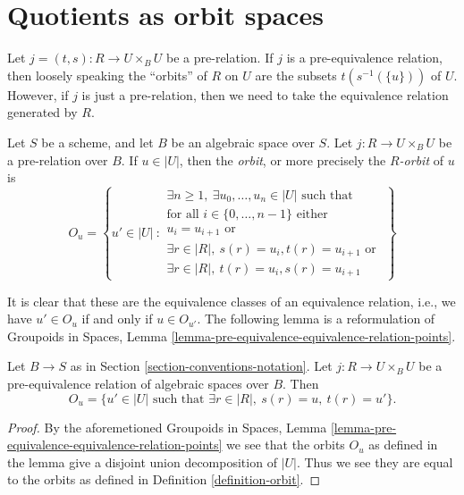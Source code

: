 \section{Quotients as orbit spaces}
\label{section-orbits}

\noindent
Let $j = (t, s) : R \to U \times_B U$ be a pre-relation.
If $j$ is a pre-equivalence relation, then loosely speaking
the ``orbits'' of $R$ on $U$
are the subsets $t(s^{-1}(\{u\}))$ of $U$. However, if $j$ is just a
pre-relation, then we need to take the equivalence relation generated
by $R$.

\begin{definition}
\label{definition-orbit}
Let $S$ be a scheme, and let $B$ be an algebraic space over $S$.
Let $j : R \to U \times_B U$ be a pre-relation over $B$.
If $u \in |U|$, then the {\it orbit}, or more precisely the
{\it $R$-orbit} of $u$ is
$$
O_u =
\left\{
u' \in |U|\ :
\begin{matrix}
\exists n \geq 1,\ \exists u_0, \ldots, u_n \in |U|\text{ such that} \\
\text{for all }i \in \{0, \ldots, n - 1\}\text{ either } \\
u_i = u_{i + 1}\text{ or } \\
\exists r \in |R|,\ s(r) = u_i, t(r) = u_{i + 1}
\text{ or } \\
\exists r \in |R|,\ t(r) = u_i, s(r) = u_{i + 1}
\end{matrix}
\right\}
$$
\end{definition}

\noindent
It is clear that these are the equivalence classes of an equivalence relation,
i.e., we have $u' \in O_u$ if and only if $u \in O_{u'}$. The following lemma
is a reformulation of
Groupoids in Spaces,
Lemma \ref{lemma-pre-equivalence-equivalence-relation-points}.

\begin{lemma}
\label{lemma-pre-equivalence-equivalence-relation-points}
Let $B \to S$ as in Section \ref{section-conventions-notation}.
Let $j : R \to U \times_B U$ be a pre-equivalence relation
of algebraic spaces over $B$. Then
$$
O_u =
\{u' \in |U| \text{ such that } \exists r \in |R|,\ s(r) = u,\ t(r) = u'\}.
$$
\end{lemma}

\begin{proof}
By the aforemetioned
Groupoids in Spaces,
Lemma \ref{lemma-pre-equivalence-equivalence-relation-points}
we see that the orbits $O_u$ as defined in the lemma give a disjoint
union decomposition of $|U|$. Thus we see they are equal to the
orbits as defined in Definition \ref{definition-orbit}.
\end{proof}

